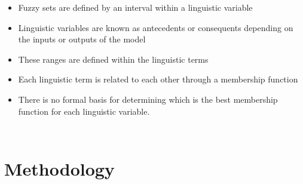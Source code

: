\documentclass[aspectratio=169]{beamer} %
\begin{document}
{{{{{\begin{frame}
\begin{flushright}
\begin{columns}
        \centering
         \begin{itemize}
          \item Fuzzy sets are defined by an interval within a linguistic variable 
          \pause
          \item Linguistic variables are known as antecedents or consequents depending on the inputs or outputs of the model    
          \pause
           \item These ranges are defined within the linguistic terms
           \pause
          \item Each linguistic term is related to each other through a membership function
           \pause
           \item There is no formal basis for determining which is the best membership function for each linguistic variable.
           \pause
     
         \end{itemize}	     	

    \end{columns}

\end{flushright}

\begin{flushright}
\citep{Jafelice2012,josh2019,Siddig2021}
\end{flushright}
\end{frame} }







\section{Methodology}

{

}}}}}
\end{document}

